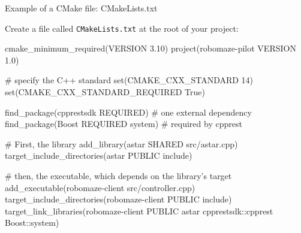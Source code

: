 \documentclass[compress]{beamer}
\begin{document}
\begin{frame}[fragile]{Example of a CMake file: CMakeLists.txt}

Create a file called \texttt{CMakeLists.txt} at the root of your project:

\begin{cmakecode}
cmake_minimum_required(VERSION 3.10)
project(robomaze-pilot VERSION 1.0)

# specify the C++ standard
set(CMAKE_CXX_STANDARD 14)
set(CMAKE_CXX_STANDARD_REQUIRED True)

find_package(cpprestsdk REQUIRED) # one external dependency
find_package(Boost REQUIRED system) # required by cpprest

# First, the library
add_library(astar SHARED src/astar.cpp)
target_include_directories(astar PUBLIC include)

# then, the executable, which depends on the library's target
add_executable(robomaze-client src/controller.cpp)
target_include_directories(robomaze-client PUBLIC include)
target_link_libraries(robomaze-client PUBLIC astar cpprestsdk::cpprest Boost::system)
\end{cmakecode}

\end{frame}
\end{document}
